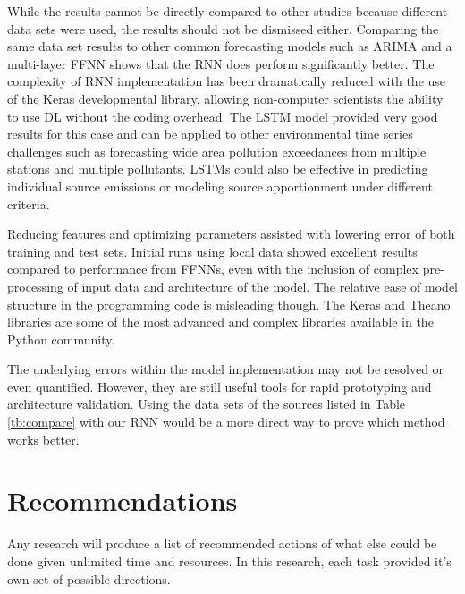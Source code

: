 While the results cannot be directly compared to other studies because different data sets were used, the results should not be dismissed either. Comparing the same data set results to other common forecasting models such as ARIMA and a multi-layer FFNN shows that the RNN does perform significantly better. The complexity of RNN implementation has been dramatically reduced with the use of the Keras developmental library, allowing non-computer scientists the ability to use DL without the coding overhead. The LSTM model provided very good results for this case and can be applied to other environmental time series challenges such as forecasting wide area pollution exceedances from multiple stations and multiple pollutants. LSTMs could also be effective in predicting individual source emissions or modeling source apportionment under different criteria. 

Reducing features and optimizing parameters assisted with lowering error of both training and test sets. Initial runs using local data showed excellent results compared to performance from FFNNs, even with the inclusion of complex pre-processing of input data and architecture of the model. The relative ease of model structure in the programming code is misleading though. The Keras and Theano libraries are some of the most advanced and complex libraries available in the Python community. 

The underlying errors within the model implementation may not be resolved or even quantified. However, they are still useful tools for rapid prototyping and architecture validation. Using the data sets of the sources listed in Table \ref{tb:compare} with our RNN would be a more direct way to prove which method works better.

\section{Recommendations}

Any research will produce a list of recommended actions of what else could be done given unlimited time and resources. In this research, each task provided it's own set of possible directions.
\\

